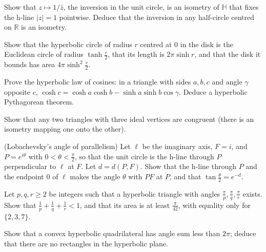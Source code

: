 \begin{exercise}[$\star$]\label{ex:inversioniso}
Show that $z\mapsto1/\bar z$, the inversion in the unit circle, is an isometry of $\mathbb H$ that fixes the h-line $|z|=1$ pointwise. Deduce that the
inversion in any half-circle centred on $\mathbb R$ is an isometry.
\end{exercise}

\begin{exercise}[$\star\star$]\label{ex:circles}
Show that the hyperbolic circle of radius $r$ centred at $0$ in the disk is the Euclidean circle of radius $\tanh\frac r2$, that its length is $2\pi\sinh r$, and
that the disk it bounds has area $4\pi\sinh^2\frac r2$.
\end{exercise}

\begin{exercise}[$\star\star$]\label{ex:hypcos}
Prove the hyperbolic law of cosines: in a triangle with sides $a,b,c$ and angle $\gamma$ opposite $c$,
$\cosh c=\cosh a\cosh b-\sinh a\sinh b\cos\gamma$. Deduce a hyperbolic Pythagorean theorem.
\end{exercise}

\begin{exercise}[$\star$]\label{ex:ideal}
Show that any two triangles with three ideal vertices are congruent (there is an isometry mapping one onto the other).
\end{exercise}

\begin{exercise}[$\star\star$]\label{ex:parallelangle}
(Lobachevsky's angle of parallelism) Let $\ell$ be the imaginary axis, $F=i$, and $P=e^{i\theta}$ with $0<\theta<\frac\pi2$, so that the unit circle is the
h-line through $P$ perpendicular to $\ell$ at $F$. Let $d=d(P,F)$. Show that the h-line through $P$ and the endpoint $0$ of $\ell$ makes the angle $\theta$
with $PF$ at $P$, and that $\tan\frac\theta2=e^{-d}$.
\end{exercise}

\begin{exercise}[$\star$]\label{ex:tilings}
Let $p,q,r\ge2$ be integers such that a hyperbolic triangle with angles $\frac\pi p,\frac\pi q,\frac\pi r$ exists. Show that
$\frac1p+\frac1q+\frac1r<1$, and that its area is at least $\frac\pi{42}$, with equality only for $\{2,3,7\}$.
\end{exercise}

\begin{exercise}[$\star\star$]\label{ex:quadrilateral}
Show that a convex hyperbolic quadrilateral has angle sum less than $2\pi$; deduce that there are no rectangles in the hyperbolic plane.
\end{exercise}

